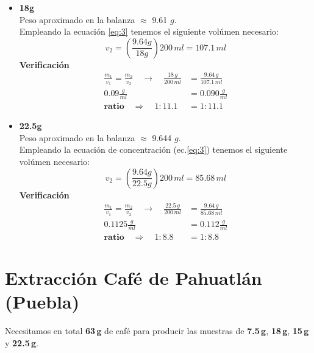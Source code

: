 \documentclass{article}
\begin{document}
\begin{itemize}
\item[$\bullet$] \textbf{18g} \\
Peso aproximado en la balanza $\approx$  9.61 $g$.\\
Empleando la ecuación \ref{eq:3} tenemos el siguiente volúmen necesario:
\[  v_{2} = \left(  \frac{9\text{.}64g   }{18g}  \right) 200\, ml = 107\text{.}1\, ml  \]
\textbf{Verificación}
\begin{equation*}
\begin{split}
 \frac{m_{1}}{v_{1}} = \frac{ m_{2} }{v_{2}} \quad \to \quad \frac{ 18\, g  }{200 \, ml} &= \frac{ 9\text{.}64\, g }{107\text{.}1\,ml}\\
0\text{.}09 \frac{g}{ml} &= 0\text{.}090 \frac{g}{ml}\\
\textbf{ratio} \quad \Rightarrow \quad  \boxed{1:11\text{.}1} &= \boxed{1:11\text{.}1} 
\end{split}
\end{equation*}
\end{itemize}

\begin{itemize}
\item[$\bullet$] \textbf{22.5g} \\
Peso aproximado en la balanza $\approx$  9.644 $g$.\\
Empleando la ecuación de concentración  (ec.\ref{eq:3}) tenemos el siguiente volúmen necesario:
\[  v_{2} = \left(  \frac{9\text{.}64g   }{22\text{.}5g}  \right) 200\, ml = 85\text{.}68\, ml  \]
\textbf{Verificación}
\begin{equation*}
\begin{split}
 \frac{m_{1}}{v_{1}} = \frac{ m_{2} }{v_{2}} \quad \to \quad \frac{ 22\text{.}5\, g  }{200 \, ml} &= \frac{9\text{.}64\, g }{85\text{.}68\,ml}\\
0\text{.}1125 \frac{g}{ml} &= 0\text{.}112 \frac{g}{ml}\\
\textbf{ratio} \quad \Rightarrow \quad  \boxed{1:8\text{.}8} &= \boxed{1:8\text{.}8} 
\end{split}
\end{equation*}
\end{itemize}

\section{Extracción Café de Pahuatlán (Puebla)}

Necesitamos en total \textbf{63\,g} de café para producir las muestras de \textbf{7.5\,g}, \textbf{18\,g}, \textbf{15\,g} y \textbf{22.5\,g}.
\end{document}

